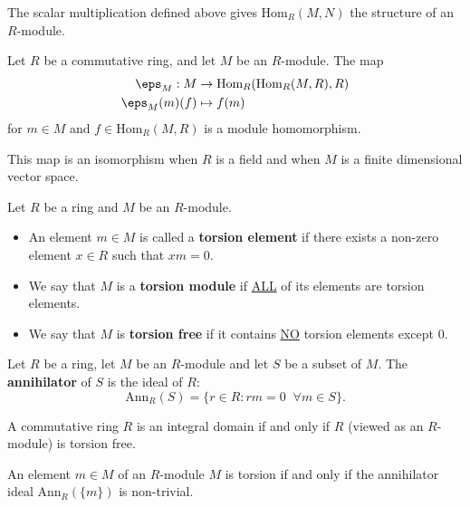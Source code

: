 \documentclass[12pt, a4paper]{article}
\begin{document}
\begin{theorem}
    The scalar multiplication defined above gives \(\text{Hom}_R(M,N)\) the structure of an \(R\)-module.
\end{theorem}

\begin{mdthm}
    Let \(R\) be a commutative ring, and let \(M\) be an \(R\)-module. The map 
    \[\begin{aligned}
        \eps_M : M &\to \text{Hom}_R(\text{Hom}_R(M,R),R)\\
        \eps_M(m)(f)&\mapsto f(m)
    \end{aligned}\]
    for \(m \in M\) and \(f \in \text{Hom}_R(M,R)\) is a module homomorphism. 
\end{mdthm}

\begin{mdremark}
    This map is an isomorphism when \(R\) is a field and when \(M\) is a finite dimensional vector space.
\end{mdremark}

\begin{definition}
    Let \(R\) be a ring and \(M\) be an \(R\)-module.
    \begin{itemize}
        \item An element \(m \in M\) is called a \textbf{torsion element} if there exists a non-zero element \(x \in R\) such that \(xm=0\). 
        \item We say that \(M\) is a \textbf{torsion module} if \underline{ALL} of its elements are torsion elements.
        \item We say that \(M\) is \textbf{torsion free} if it contains \underline{NO} torsion elements except \(0\).
    \end{itemize}
\end{definition}

\begin{definition}
    Let \(R\) be a ring, let \(M\) be an \(R\)-module and let \(S\) be a subset of \(M\). The \textbf{annihilator} of \(S\) is the ideal of \(R\):
    \[\text{Ann}_R(S) = \{r \in R : rm=0 \;\; \forall m \in S\}.\]
\end{definition}

\begin{theorem}
    A commutative ring \(R\) is an integral domain if and only if \(R\) (viewed as an \(R\)-module) is torsion free.
\end{theorem}

\begin{mdthm}
    An element \(m \in M\) of an \(R\)-module \(M\) is torsion if and only if the annihilator ideal \(\text{Ann}_R(\{m\})\) is non-trivial.
\end{mdthm}
\end{document}
